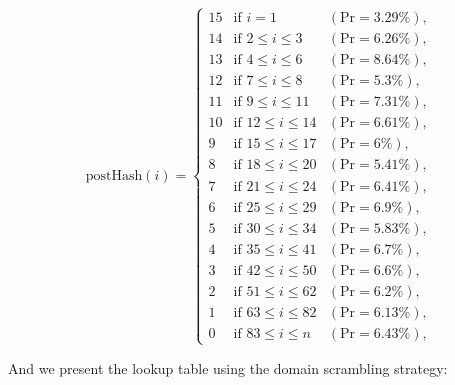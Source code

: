 {
\renewcommand{\arraystretch}{1.25}
\[
\text{postHash}(i) = \left\{
\begin{array}{lll}
    \text{15} & \text{if } i = 1 & (\text{Pr} = 3.29\%), \\
    \text{14} & \text{if } 2 \leq i \leq 3 & (\text{Pr} = 6.26\%), \\
    \text{13} & \text{if } 4 \leq i \leq 6 & (\text{Pr} = 8.64\%), \\
    \text{12} & \text{if } 7 \leq i \leq 8 & (\text{Pr} = 5.3\%), \\
    \text{11} & \text{if } 9 \leq i \leq 11 & (\text{Pr} = 7.31\%), \\
    \text{10} & \text{if } 12 \leq i \leq 14 & (\text{Pr} = 6.61\%), \\
    \text{9} & \text{if } 15 \leq i \leq 17 & (\text{Pr} = 6\%), \\
    \text{8} & \text{if } 18 \leq i \leq 20 & (\text{Pr} = 5.41\%), \\
    \text{7} & \text{if } 21 \leq i \leq 24 & (\text{Pr} = 6.41\%), \\
    \text{6} & \text{if } 25 \leq i \leq 29 & (\text{Pr} = 6.9\%), \\
    \text{5} & \text{if } 30 \leq i \leq 34 & (\text{Pr} = 5.83\%), \\
    \text{4} & \text{if } 35 \leq i \leq 41 & (\text{Pr} = 6.7\%), \\
    \text{3} & \text{if } 42 \leq i \leq 50 & (\text{Pr} = 6.6\%), \\
    \text{2} & \text{if } 51 \leq i \leq 62 & (\text{Pr} = 6.2\%), \\
    \text{1} & \text{if } 63 \leq i \leq 82 & (\text{Pr} = 6.13\%), \\
    \text{0} & \text{if } 83 \leq i \leq n & (\text{Pr} = 6.43\%),
\end{array}
\right.
\]
}

And we present the lookup table using the domain scrambling strategy: 



